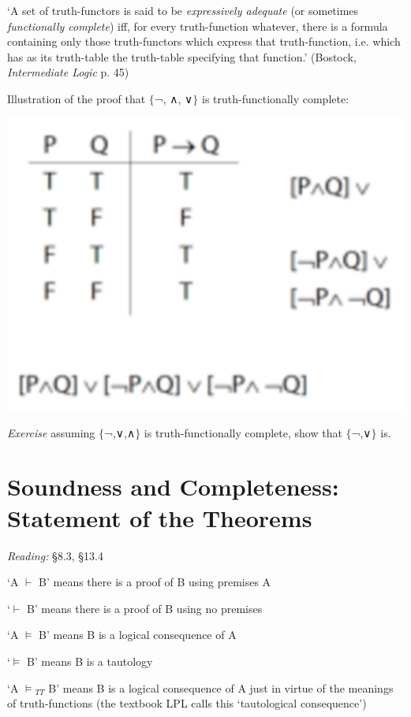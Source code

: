 \documentclass[12pt]{extarticle}
\begin{document}
\begin{multicols*}{3}
‘A set of truth-functors is said to be \emph{expressively adequate} (or sometimes \emph{functionally complete}) iff, for every truth-function whatever, there is a formula containing only those truth-functors which express that truth-function, i.e. which has as its truth-table the truth-table specifying that function.’ (Bostock, \emph{Intermediate Logic} p. 45)
 
Illustration of the proof that $\{$¬, ∧, ∨$\}$ is truth-functionally complete:
 
\begin{center}
\includegraphics[scale=0.3]{img/unit_430_fig2.pdf}
\end{center}
\emph{Exercise} assuming $\{$¬,∨,∧$\}$ is truth-functionally complete, show that $\{$¬,∨$\}$ is.
 
 
 
\section{Soundness and Completeness: Statement of the Theorems}
 
\emph{Reading:} §8.3, §13.4
 
‘A $\vdash$ B’ means there is a proof of B using premises A
 
‘$\vdash$ B’ means there is a proof of B using no premises
 
‘A $\models$ B’ means B is a logical consequence of A
 
‘$\models$ B’ means B is a tautology
 
‘A $\models$$_{TT}$ B’ means B is a logical consequence of A just in virtue of the meanings of truth-functions (the textbook LPL calls this ‘tautological consequence’)
 

\end{multicols*}
\end{document}

